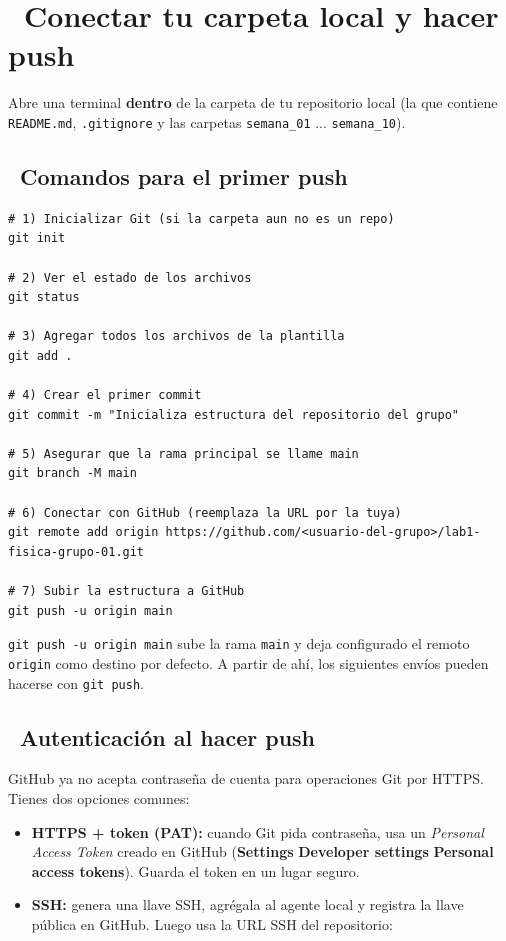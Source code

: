 \documentclass[11pt,a4paper]{article}
\newcommand{\iconotexto}[2]{\textcolor{cyanNeon}{\faIcon{#1}}~#2}
\begin{document}
\section{\iconotexto{upload}{Conectar tu carpeta local y hacer push}}

Abre una terminal \textbf{dentro} de la carpeta de tu repositorio local (la que contiene \texttt{README.md}, \texttt{.gitignore} y las carpetas \texttt{semana\_01} ... \texttt{semana\_10}).

\subsection{\iconotexto{play-circle}{Comandos para el primer push}}

\begin{lstlisting}
# 1) Inicializar Git (si la carpeta aun no es un repo)
git init

# 2) Ver el estado de los archivos
git status

# 3) Agregar todos los archivos de la plantilla
git add .

# 4) Crear el primer commit
git commit -m "Inicializa estructura del repositorio del grupo"

# 5) Asegurar que la rama principal se llame main
git branch -M main

# 6) Conectar con GitHub (reemplaza la URL por la tuya)
git remote add origin https://github.com/<usuario-del-grupo>/lab1-fisica-grupo-01.git

# 7) Subir la estructura a GitHub
git push -u origin main
\end{lstlisting}

\begin{cajaConcepto}
\texttt{git push -u origin main} sube la rama \texttt{main} y deja configurado el remoto \texttt{origin} como destino por defecto. A partir de ahí, los siguientes envíos pueden hacerse con \texttt{git push}.
\end{cajaConcepto}

\subsection{\iconotexto{key}{Autenticación al hacer push}}

GitHub ya no acepta contraseña de cuenta para operaciones Git por HTTPS. Tienes dos opciones comunes:

\begin{itemize}[leftmargin=1.4em,itemsep=4pt,topsep=2pt]
  \item \textbf{HTTPS + token (PAT):} cuando Git pida contraseña, usa un \emph{Personal Access Token} creado en GitHub (\textbf{Settings} \textrightarrow{} \textbf{Developer settings} \textrightarrow{} \textbf{Personal access tokens}). Guarda el token en un lugar seguro.
  \item \textbf{SSH:} genera una llave SSH, agrégala al agente local y registra la llave pública en GitHub. Luego usa la URL SSH del repositorio:
\end{itemize}
\end{document}
